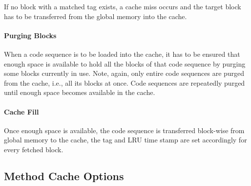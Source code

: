 \documentclass[a4paper,fontsize=10pt,twoside,DIV15,BCOR12mm,headinclude=true,footinclude=false,pagesize,bibtotoc]{scrbook}
\newcommand{\comment}[3]{

\textsf{\textbf{#1}} {\color{#3}#2}}
\newcommand{\martin}[1]{\comment{Martin}{#1}{Blue}}
\renewcommand{\martin}[1]{}
\begin{document}
If no block with a matched tag exists, a cache miss occurs and the target block
has to be transferred from the global memory into the cache.
\martin{We have cache misses on fetch in a LRU based method cache? I don't think so.}

\paragraph*{Purging Blocks}
When a code sequence is to be loaded into the cache, it has to be ensured that
enough space is available to hold all the blocks of that code sequence by
purging some blocks currently in use. Note, again, only entire code sequences
are purged from the cache, i.e., all its blocks at once. Code sequences are
repeatedly purged until enough space becomes available in the cache.

\paragraph*{Cache Fill}
Once enough space is available, the code sequence is transferred block-wise from
global memory to the cache, the tag and LRU time stamp are set accordingly for
every fetched block.

\martin{You might all know my position on an LRU based method cache, right?
It will be a plain mess to implement and maybe an issue on the HW
side (fully associative lookup at each fetch!). However, if one would
like to go this direction, it might be an interesting experiment.
One optimization point could be instead of the full associative lookup
on each fetch to have a translation table of block addresses to cache
blocks. This might add `just' another pipeline stage into the fetch
part.}

\martin{We could also think about doing the load/replacement
in SW - more like a managed ISPM.}

\subsection{Method Cache Options}
\label{sec:method_cache_options}
\end{document}
